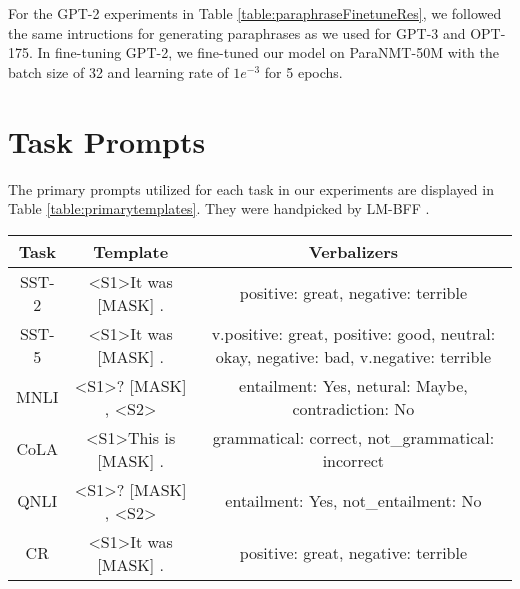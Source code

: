 \documentclass[11pt]{article}
\begin{document}
For the GPT-2 experiments in Table \ref{table:paraphraseFinetuneRes}, we followed the same intructions for generating paraphrases as we used for GPT-3 and OPT-175. In fine-tuning GPT-2, we fine-tuned our model on ParaNMT-50M \cite{wieting-gimpel-2018-paranmt} with the batch size of 32 and learning rate of $1e^{-3}$ for 5 epochs.

\section{Task Prompts}
\label{appendix:TaskPrompt}

The primary prompts utilized for each task in our experiments are displayed in Table \ref{table:primarytemplates}. They were handpicked by LM-BFF \cite{gao2021making}.

\begin{table*}[!ht]
    \centering
    \small
    \begin{tabular}{c|cc}
    \hline
    Task  & Template                                                             & Verbalizers                                                                           \\ \hline
    SST-2 & \textless{}S1\textgreater It was {[}MASK{]} .                        & positive: great, negative: terrible                                                   \\
    SST-5 & \textless{}S1\textgreater It was {[}MASK{]} .                        & v.positive: great, positive: good, neutral: okay, negative: bad, v.negative: terrible \\
    MNLI  & \textless{}S1\textgreater ? {[}MASK{]} , \textless{}S2\textgreater{} & entailment: Yes, netural: Maybe, contradiction: No                                    \\
    CoLA  & \textless{}S1\textgreater This is {[}MASK{]} .                       & grammatical: correct, not\_grammatical: incorrect                                     \\
    QNLI  & \textless{}S1\textgreater ? {[}MASK{]} , \textless{}S2\textgreater{} & entailment: Yes, not\_entailment: No                                                  \\
    CR    & \textless{}S1\textgreater It was {[}MASK{]} .                        & positive: great, negative: terrible                                                   \\ \hline
    \end{tabular}
    \caption{Primary templates and verbalizers (label words) used in our experiments.}
    \label{table:primarytemplates}
\end{table*}
\end{document}
